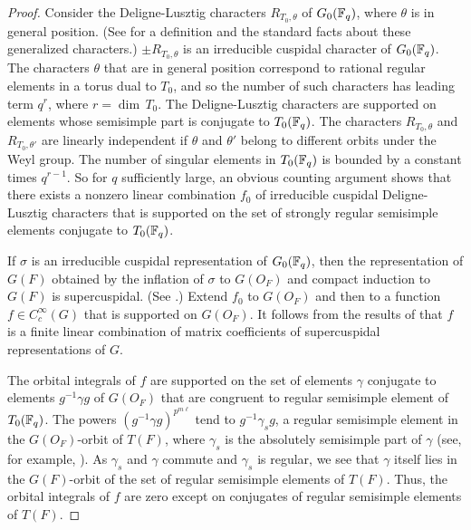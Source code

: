 \documentclass{amsart}
\newcommand\Fq{{\Bbb F}_q}
\begin{document}
\begin{proof}  Consider the Deligne-Lusztig characters
$R_{T_0,\theta}$ of $G_0(\Fq)$, where $\theta$ is in general
position. (See \cite{C} for a definition and the standard
facts about these generalized characters.)
 $\pm R_{T_0,\theta}$ is an irreducible cuspidal
character of $G_0(\Fq)$.  
 The characters $\theta$ that are
in general position correspond to 
rational regular elements in
a torus dual to $T_0$, and so the number of such characters
has leading term $q^r$, where $r=\dim\,T_0$.  The Deligne-Lusztig
characters are supported on elements whose semisimple part is conjugate
to $T_0(\Fq)$.  The characters $R_{T_0,\theta}$ and
$R_{T_0,\theta'}$ are linearly independent if $\theta$ and $\theta'$
belong to different orbits under the Weyl group.
The number of singular
elements in $T_0(\Fq)$ is bounded by a constant times $q^{r-1}$.
So for $q$ sufficiently large, an obvious counting argument
shows that there exists a  nonzero linear
combination $f_0$ of irreducible cuspidal
Deligne-Lusztig characters that is supported on the set of
strongly regular semisimple elements conjugate to $T_0(\Fq)$.

If $\sigma$ is an irreducible cuspidal representation of $G_0(\Fq)$,
then the representation of $G(F)$ obtained by the inflation of $\sigma$
to $G(O_F)$ and compact induction to $G(F)$ is supercuspidal.
(See \cite{G,5.2}.)  Extend $f_0$ to $G(O_F)$ and then 
to a function $f\in C_c^\infty(G)$
that is supported on $G(O_F)$.  It follows from the results of
\cite{G,5.2} that $f$ is a finite linear combination of matrix coefficients
of supercuspidal representations of $G$.

The orbital integrals of $f$ are supported on the set of elements 
$\gamma$ conjugate
to elements $g^{-1}\gamma g$
of $G(O_F)$ that are congruent to regular semisimple
element of $T_0(\Fq)$. The powers $(g^{-1}\gamma g)^{p^{m\ell}}$ tend
to $g^{-1}\gamma_s g$, a regular
semisimple element in the $G(O_F)$-orbit of
$T(F)$, where
$\gamma_s$ is the absolutely semisimple part of $\gamma$
(see, for example, \cite{H2,3}).  As $\gamma_s$
and $\gamma$ commute and $\gamma_s$ is regular, we see that $\gamma$
itself lies in the $G(F)$-orbit of the set of regular semisimple
elements of $T(F)$.  Thus, the orbital integrals of $f$ are zero except
on conjugates of regular semisimple elements of $T(F)$.


\end{proof}
\end{document}

